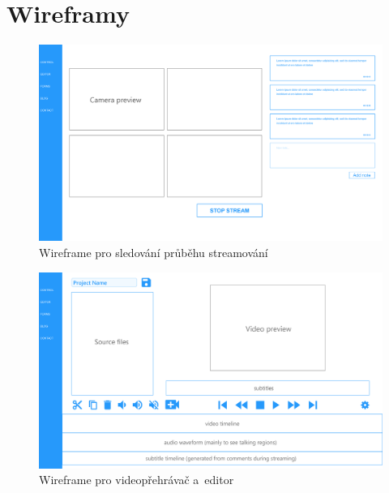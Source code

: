 \documentclass[thesis=M,czech]{FITthesis}[2012/06/26]
\begin{document}
\chapter{Wireframy} \label{chap:wireframes}

\begin{figure}[h]\centering
	\includegraphics[width=1\paperwidth, angle=90]{images/ui_wf_ulab-stream.eps}
	\caption{Wireframe pro sledování průběhu streamování}\label{img:navrh_frontend_ui_wf_preview}
\end{figure}

\begin{figure}[h]\centering
	\includegraphics[width=1\paperwidth, angle=90]{images/ui_wf_ulab-editor-1.eps}
	\caption{Wireframe pro videopřehrávač a~editor}\label{img:navrh_frontend_ui_wf_editor}
\end{figure}
\end{document}
